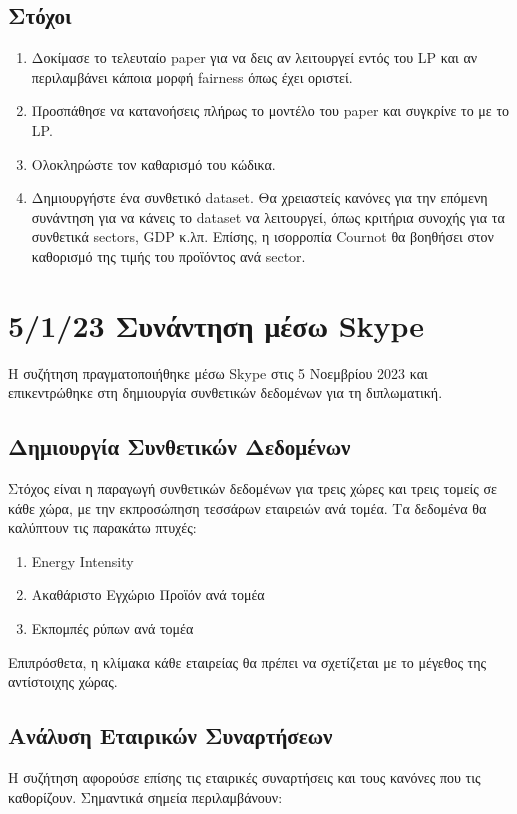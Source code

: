 \documentclass[a4paper,twoside,10pt]{article}
\begin{document}
\subsection{Στόχοι}
\begin{enumerate}
	\item Δοκίμασε το τελευταίο paper για να δεις αν λειτουργεί εντός του LP και αν περιλαμβάνει κάποια μορφή fairness όπως έχει οριστεί.
	\item Προσπάθησε να κατανοήσεις πλήρως το μοντέλο του paper και συγκρίνε το με το LP.
	\item Ολοκληρώστε τον καθαρισμό του κώδικα.
	\item Δημιουργήστε ένα συνθετικό dataset. Θα χρειαστείς κανόνες για την επόμενη συνάντηση για να κάνεις το dataset να λειτουργεί, όπως κριτήρια συνοχής για τα συνθετικά sectors, GDP κ.λπ. Επίσης, η ισορροπία Cournot θα βοηθήσει στον καθορισμό της τιμής του προϊόντος ανά sector.
\end{enumerate}

\section{5/1/23 Συνάντηση μέσω Skype}
Η συζήτηση πραγματοποιήθηκε μέσω Skype στις 5 Νοεμβρίου 2023 και επικεντρώθηκε στη δημιουργία συνθετικών δεδομένων για τη διπλωματική.

\subsection{Δημιουργία Συνθετικών Δεδομένων}
Στόχος είναι η παραγωγή συνθετικών δεδομένων για τρεις χώρες και τρεις τομείς σε κάθε χώρα, με την εκπροσώπηση τεσσάρων εταιρειών ανά τομέα. Τα δεδομένα θα καλύπτουν τις παρακάτω πτυχές:

\begin{enumerate}
	\item Energy Intensity
	\item Ακαθάριστο Εγχώριο Προϊόν ανά τομέα
	\item Εκπομπές ρύπων ανά τομέα
\end{enumerate}

Επιπρόσθετα, η κλίμακα κάθε εταιρείας θα πρέπει να σχετίζεται με το μέγεθος της αντίστοιχης χώρας.

\subsection{Ανάλυση Εταιρικών Συναρτήσεων}
Η συζήτηση αφορούσε επίσης τις εταιρικές συναρτήσεις και τους κανόνες που τις καθορίζουν. Σημαντικά σημεία περιλαμβάνουν:
\end{document}
